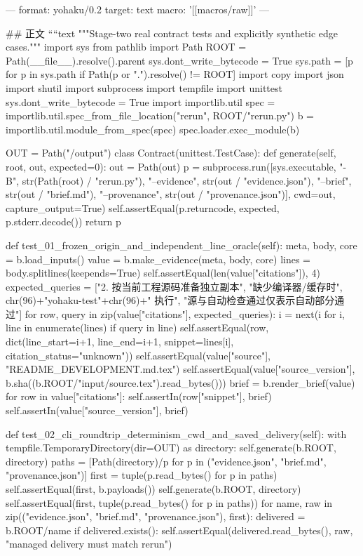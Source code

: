 ---
format: yohaku/0.2
target: text
macro: '[[macros/raw]]'
---

## 正文
````text
"""Stage-two real contract tests and explicitly synthetic edge cases."""
import sys
from pathlib import Path
ROOT = Path(__file__).resolve().parent
sys.dont_write_bytecode = True
sys.path = [p for p in sys.path if Path(p or ".").resolve() != ROOT]
import copy
import json
import shutil
import subprocess
import tempfile
import unittest
sys.dont_write_bytecode = True
import importlib.util
spec = importlib.util.spec_from_file_location("rerun", ROOT/"rerun.py")
b = importlib.util.module_from_spec(spec)
spec.loader.exec_module(b)

OUT = Path("/output")
class Contract(unittest.TestCase):
    def generate(self, root, out, expected=0):
        out = Path(out)
        p = subprocess.run([sys.executable, "-B", str(Path(root) / "rerun.py"),
            "--evidence", str(out / "evidence.json"), "--brief", str(out / "brief.md"),
            "--provenance", str(out / "provenance.json")], cwd=out, capture_output=True)
        self.assertEqual(p.returncode, expected, p.stderr.decode())
        return p

    def test_01_frozen_origin_and_independent_line_oracle(self):
        meta, body, core = b.load_inputs()
        value = b.make_evidence(meta, body, core)
        lines = body.splitlines(keepends=True)
        self.assertEqual(len(value["citations"]), 4)
        expected_queries = ["2. 按当前工程源码准备独立副本", "缺少编译器/缓存时",
                            chr(96)+"yohaku-test"+chr(96)+" 执行", "源与自动检查通过仅表示自动部分通过"]
        for row, query in zip(value["citations"], expected_queries):
            i = next(i for i, line in enumerate(lines) if query in line)
            self.assertEqual(row, dict(line_start=i+1, line_end=i+1, snippet=lines[i],
                                      citation_status="unknown"))
        self.assertEqual(value["source"], "README_DEVELOPMENT.md.tex")
        self.assertEqual(value["source_version"], b.sha((b.ROOT/"input/source.tex").read_bytes()))
        brief = b.render_brief(value)
        for row in value["citations"]:
            self.assertIn(row["snippet"], brief)
            self.assertIn(value["source_version"], brief)

    def test_02_cli_roundtrip_determinism_cwd_and_saved_delivery(self):
        with tempfile.TemporaryDirectory(dir=OUT) as directory:
            self.generate(b.ROOT, directory)
            paths = [Path(directory)/p for p in ("evidence.json", "brief.md", "provenance.json")]
            first = tuple(p.read_bytes() for p in paths)
            self.assertEqual(first, b.payloads())
            self.generate(b.ROOT, directory)
            self.assertEqual(first, tuple(p.read_bytes() for p in paths))
            for name, raw in zip(("evidence.json", "brief.md", "provenance.json"), first):
                delivered = b.ROOT/name
                if delivered.exists():
                    self.assertEqual(delivered.read_bytes(), raw, "managed delivery must match rerun")

